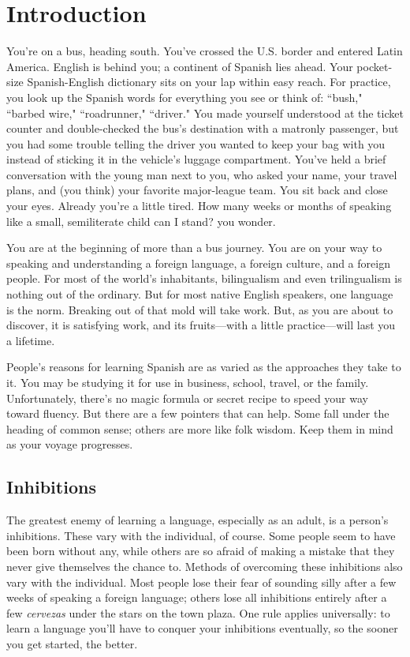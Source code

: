 \chapter{Introduction}

You're on a bus, heading south. You've crossed the U.S. border
and entered Latin America. English is behind you; a continent of Spanish lies ahead. Your pocket-size Spanish-English dictionary sits on your
lap within easy reach. For practice, you look up the Spanish words for
everything you see or think of: ``bush," ``barbed wire," ``roadrunner,"
``driver." You made yourself understood at the ticket counter and
double-checked the bus's destination with a matronly passenger, but
you had some trouble telling the driver you wanted to keep your bag
with you instead of sticking it in the vehicle's luggage compartment.
You've held a brief conversation with the young man next to you,
who asked your name, your travel plans, and (you think) your favorite
major-league team. You sit back and close your eyes. Already you're a
little tired. How many weeks or months of speaking like a small, semiliterate child can I stand? you wonder.

You are at the beginning of more than a bus journey. You are
on your way to speaking and understanding a foreign language, a foreign culture, and a foreign people. For most of the world's inhabitants,
bilingualism and even trilingualism is nothing out of the ordinary. But
for most native English speakers, one language is the norm. Breaking
out of that mold will take work. But, as you are about to discover, it is
satisfying work, and its fruits---with a little practice---will last you a
lifetime.

People's reasons for learning Spanish are as varied as the approaches they take to it. You may be studying it for use in business,
school, travel, or the family. Unfortunately, there's no magic formula
or secret recipe to speed your way toward fluency. But there are a few
pointers that can help. Some fall under the heading of common sense;
others are more like folk wisdom. Keep them in mind as your voyage
progresses.

\section{Inhibitions}

The greatest enemy of learning a language, especially as an
adult, is a person's inhibitions. These vary with the individual, of
course. Some people seem to have been born without any, while others are so afraid of making a mistake that they never give themselves
the chance to. Methods of overcoming these inhibitions also vary with
the individual. Most people lose their fear of sounding silly after a few
weeks of speaking a foreign language; others lose all inhibitions entirely after a few \emph{cervezas} under the stars on the town plaza. One rule
applies universally: to learn a language you'll have to conquer your inhibitions eventually, so the sooner you get started, the better.

